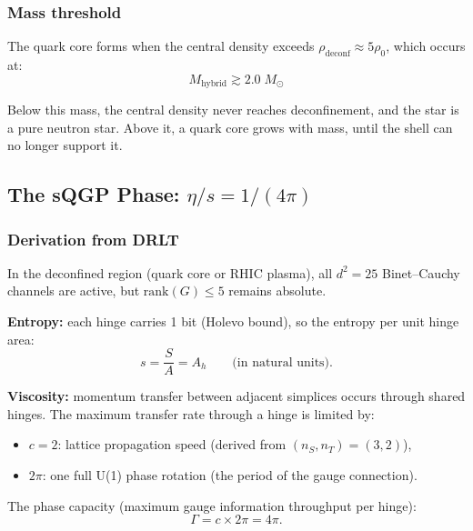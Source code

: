\documentclass[12pt]{article}
\theoremstyle{remark}
\theoremstyle{definition}
\begin{document}
\subsubsection{Mass threshold}

The quark core forms when the central density exceeds $\rho_\text{deconf} \approx 5\rho_0$, which occurs at:
\begin{equation}
M_\text{hybrid} \gtrsim 2.0\;M_\odot
\end{equation}

Below this mass, the central density never reaches deconfinement, and the star is a pure neutron star. Above it, a quark core grows with mass, until the shell can no longer support it.

\subsection{The sQGP Phase: $\eta/s = 1/(4\pi)$}

\subsubsection{Derivation from DRLT}

In the deconfined region (quark core or RHIC plasma), all $d^2 = 25$ Binet--Cauchy channels are active, but $\text{rank}(G) \leq 5$ remains absolute.

\textbf{Entropy:} each hinge carries 1 bit (Holevo bound), so the entropy per unit hinge area:
\begin{equation}
s = \frac{S}{A} = A_h \qquad \text{(in natural units)}.
\end{equation}

\textbf{Viscosity:} momentum transfer between adjacent simplices occurs through shared hinges. The maximum transfer rate through a hinge is limited by:
\begin{itemize}
\item $c = 2$: lattice propagation speed (derived from $(n_S, n_T) = (3, 2)$),
\item $2\pi$: one full U(1) phase rotation (the period of the gauge connection).
\end{itemize}

The phase capacity (maximum gauge information throughput per hinge):
\begin{equation}
\Gamma = c \times 2\pi = 4\pi.
\end{equation}
\end{document}
